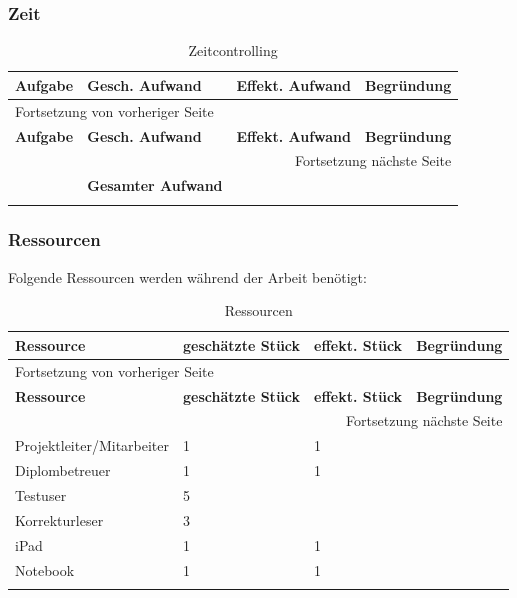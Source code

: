 \newpage
\begin{landscape}
\subsubsection{Zeit}
\label{sec:orgf7535b8}

\begin{longtable}{|p{3cm}|p{5cm}|p{3cm}|p{7cm}|}
\hline
\textbf{Aufgabe}\cellcolor[HTML]{C0C0C0} & \textbf{Gesch. Aufwand}\cellcolor[HTML]{C0C0C0} & \textbf{Effekt. Aufwand}\cellcolor[HTML]{C0C0C0} & \textbf{Begründung}\cellcolor[HTML]{C0C0C0}\\
\hline
\endfirsthead
\multicolumn{4}{l}{Fortsetzung von vorheriger Seite} \\
\hline

\textbf{Aufgabe}\cellcolor[HTML]{C0C0C0} & \textbf{Gesch. Aufwand}\cellcolor[HTML]{C0C0C0} & \textbf{Effekt. Aufwand}\cellcolor[HTML]{C0C0C0} & \textbf{Begründung}\cellcolor[HTML]{C0C0C0} \\

\hline
\endhead
\hline\multicolumn{4}{r}{Fortsetzung nächste Seite} \\
\endfoot
\endlastfoot
\hline
\hline
 & \textbf{Gesamter Aufwand} &  & \\
\hline
\caption{\label{tab:orgce7c191}
Zeitcontrolling}
\\
\end{longtable}

\newpage
\subsubsection{Ressourcen}
\label{sec:orgc87dca1}

Folgende Ressourcen werden während der Arbeit benötigt:
\begin{longtable}{|p{5cm}|p{3cm}|p{3cm}|p{7cm}|}
\hline
\textbf{Ressource}\cellcolor[HTML]{C0C0C0} & \textbf{geschätzte Stück}\cellcolor[HTML]{C0C0C0} & \textbf{effekt. Stück}\cellcolor[HTML]{C0C0C0} & \textbf{Begründung}\cellcolor[HTML]{C0C0C0}\\
\hline
\endfirsthead
\multicolumn{4}{l}{Fortsetzung von vorheriger Seite} \\
\hline

\textbf{Ressource}\cellcolor[HTML]{C0C0C0} & \textbf{geschätzte Stück}\cellcolor[HTML]{C0C0C0} & \textbf{effekt. Stück}\cellcolor[HTML]{C0C0C0} & \textbf{Begründung}\cellcolor[HTML]{C0C0C0} \\

\hline
\endhead
\hline\multicolumn{4}{r}{Fortsetzung nächste Seite} \\
\endfoot
\endlastfoot
\hline
Projektleiter/Mitarbeiter & 1 & 1 & \\
Diplombetreuer & 1 & 1 & \\
Testuser & 5 &  & \\
Korrekturleser & 3 &  & \\
iPad & 1 & 1 & \\
Notebook & 1 & 1 & \\
\hline
\caption{\label{tab:orgea23da7}
Ressourcen}
\\
\end{longtable}
\end{landscape}

